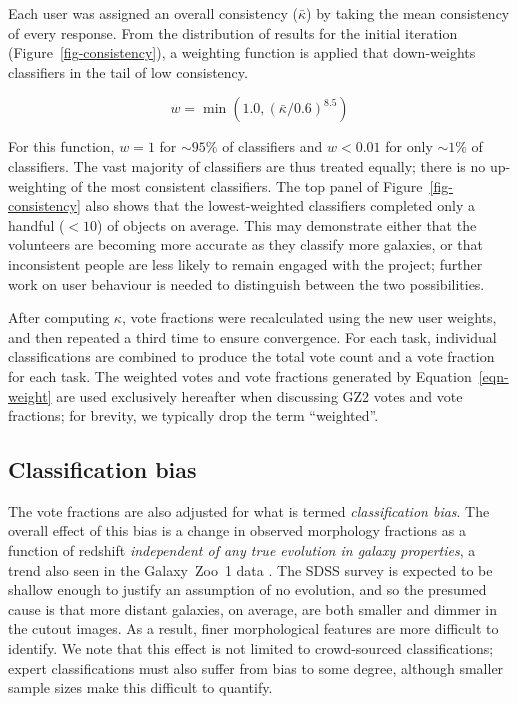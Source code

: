 \documentclass[useAMS,usenatbib]{mn2e}
\providecommand{\DIFaddtex}[1]{{\protect\color{blue}\uwave{#1}}} %
\providecommand{\DIFaddbegin}{} %
\providecommand{\DIFaddend}{} %
\providecommand{\DIFadd}[1]{\texorpdfstring{\DIFaddtex{#1}}{#1}} %
\begin{document}
Each user was assigned an overall consistency ($\bar{\kappa}$) by taking the mean consistency of every response. From the distribution of results for the initial iteration (Figure~\ref{fig-consistency}), a weighting function is applied that down-weights classifiers in the tail of low consistency.

\begin{equation}
w = \min \left(1.0,(\bar{\kappa} / 0.6)^{8.5} \right)
\label{eqn-weight}
\end{equation}

\noindent For this function, $w=1$ for $\sim95\%$ of classifiers and $w<0.01$ for only $\sim1\%$ of classifiers. The vast majority of classifiers are thus treated equally; there is no up-weighting of the most consistent classifiers. The top panel of Figure~\ref{fig-consistency} also shows that the lowest-weighted classifiers completed only a handful ($<10$) of objects on average. This may demonstrate either that the volunteers are becoming more accurate as they classify more galaxies, or that inconsistent people are less likely to remain engaged with the project; further work on user behaviour is needed to distinguish between the two possibilities.

After computing $\kappa$, vote fractions were recalculated using the new user weights, and then repeated a third time to ensure convergence. For each task, individual classifications are combined to produce the total vote count and a vote fraction for each task. The weighted votes and vote fractions generated by Equation~\ref{eqn-weight} are used exclusively hereafter when discussing GZ2 votes and vote fractions; for brevity, we typically drop the term ``weighted''. 

\subsection{Classification bias}\label{ssec-classificationbias}

The vote fractions are also adjusted for what is termed {\it classification bias}. The overall effect of this bias is a change in observed morphology fractions as a function of redshift {\em independent of any true evolution in galaxy properties}, a trend also seen in the Galaxy~Zoo~1 data \citep{bam09}. The SDSS survey is expected to be shallow enough to justify an assumption of no evolution, and so the presumed cause is that more distant galaxies, on average, are both smaller and dimmer in the cutout images. As a result, finer morphological features are more difficult to identify. We note that this effect is not limited to crowd-sourced classifications; expert \DIFaddbegin \DIFadd{and automatic }\DIFaddend classifications must also suffer from bias to some degree, although smaller sample sizes make this difficult to quantify. 
\end{document}
